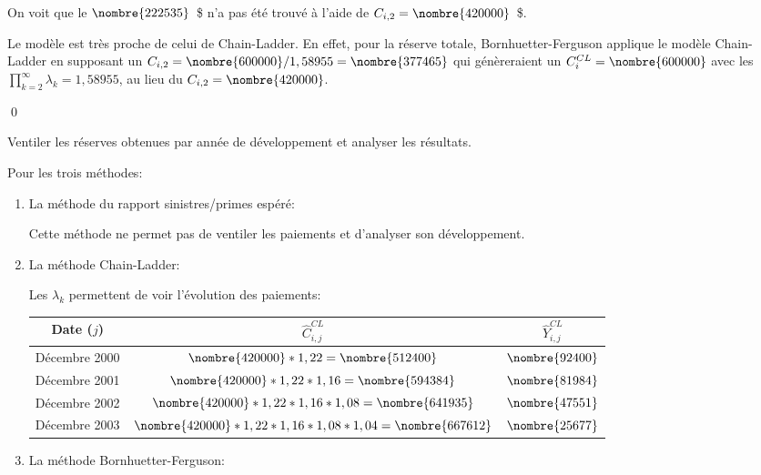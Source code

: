 \begin{exemple}
\begin{enumerate}
    On voit que le $\nombre{222535}$~\$ n'a pas été trouvé à l'aide
    de $C_{i, 2} = \nombre{420000}$~\$.

    Le modèle est très proche de celui de Chain-Ladder. En effet, pour
    la réserve totale, Bornhuetter-Ferguson applique le modèle
    Chain-Ladder en supposant un
    $C_{i,2} = \nombre{600000}/1,58955 = \nombre{377465}$ qui
    génèreraient un $C_i^{CL} = \nombre{600000}$ avec les
    $\prod_{k=2}^{\infty} \lambda_k = 1,58955$, au lieu du
    $C_{i, 2} = \nombre{420000}$.
  \end{enumerate}
  \qed
\end{exemple}

\begin{exemple}
  Ventiler les réserves obtenues par année de développement et
  analyser les résultats.

  Pour les trois méthodes:
  \begin{enumerate}
  \item La méthode du rapport sinistres/primes espéré:

    Cette méthode ne permet pas de ventiler les paiements et
    d'analyser son développement.

  \item La méthode Chain-Ladder:

    Les $\lambda_k$ permettent de voir l'évolution des paiements:
    \begin{center}
      \begin{tabular}{|c|c|c|}\hline
        Date ($j$) & $\hat{C}_{i,j}^{CL}$ & $\hat{Y}_{i,j}^{CL}$   \\ \hline
        Décembre 2000 &  $\nombre{420000}*1,22  = \nombre{512400}$ & $\nombre{92400}$ \\ \hline
        Décembre 2001 &  $\nombre{420000}*1,22*1,16 = \nombre{594384}$ & $\nombre{81984}$ \\ \hline
        Décembre 2002 &  $\nombre{420000}*1,22*1,16*1,08  =
                        \nombre{641935}$ & $\nombre{47551}$\\ \hline
        Décembre 2003 &  $\nombre{420000}*1,22*1,16*1,08*1,04 = \nombre{667612}$ & $\nombre{25677}$\\ \hline
      \end{tabular}
    \end{center}

  \item La méthode Bornhuetter-Ferguson:


\end{enumerate}
\end{exemple}

